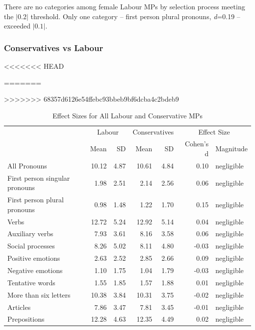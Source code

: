 \documentclass[]{article}
\theoremstyle{definition}
\theoremstyle{definition}
\theoremstyle{definition}
\theoremstyle{remark}
\begin{document}
\begin{table}[H]
\begin{table}[H]
\begin{table}[H]
\begin{table}[H]
There are no categories among female Labour MPs by selection process
meeting the \(|0.2|\) threshold. Only one category -- first person
plural pronouns, \emph{d}=0.19 -- exceeded \(|0.1|\).

\hypertarget{conservatives-vs-labour}{%
\subsubsection{Conservatives vs Labour}\label{conservatives-vs-labour}}

<<<<<<< HEAD
\begin{table}[H]
=======
\begin{table}
>>>>>>> 68357d6126e54ffebc93bbeb9bf6dcba4c2bdeb9

\caption{\label{tab:tory-labour-effect-sizes-table}Effect Sizes for All Labour and Conservative MPs}
\centering
\begin{tabular}[t]{lrrrrrl}
\toprule
\multicolumn{1}{c}{ } & \multicolumn{2}{c}{Labour} & \multicolumn{2}{c}{Conservatives} & \multicolumn{2}{c}{Effect Size} \\
\cmidrule(l{2pt}r{2pt}){2-3} \cmidrule(l{2pt}r{2pt}){4-5} \cmidrule(l{2pt}r{2pt}){6-7}
 & Mean & SD & Mean & SD & Cohen's d & Magnitude\\
\midrule
All Pronouns & 10.12 & 4.87 & 10.61 & 4.84 & 0.10 & negligible\\
First person singular pronouns & 1.98 & 2.51 & 2.14 & 2.56 & 0.06 & negligible\\
First person plural pronouns & 0.98 & 1.48 & 1.22 & 1.70 & 0.15 & negligible\\
Verbs & 12.72 & 5.24 & 12.92 & 5.14 & 0.04 & negligible\\
Auxiliary verbs & 7.93 & 3.61 & 8.16 & 3.58 & 0.06 & negligible\\
\addlinespace
Social processes & 8.26 & 5.02 & 8.11 & 4.80 & -0.03 & negligible\\
Positive emotions & 2.63 & 2.52 & 2.85 & 2.66 & 0.09 & negligible\\
Negative emotions & 1.10 & 1.75 & 1.04 & 1.79 & -0.03 & negligible\\
Tentative words & 1.55 & 1.85 & 1.57 & 1.88 & 0.01 & negligible\\
More than six letters & 10.38 & 3.84 & 10.31 & 3.75 & -0.02 & negligible\\
\addlinespace
Articles & 7.86 & 3.47 & 7.81 & 3.45 & -0.01 & negligible\\
Prepositions & 12.28 & 4.63 & 12.35 & 4.49 & 0.02 & negligible\\

\end{tabular}
\end{table}
\end{table}
\end{table}
\end{table}
\end{table}
\end{table}
\end{document}
